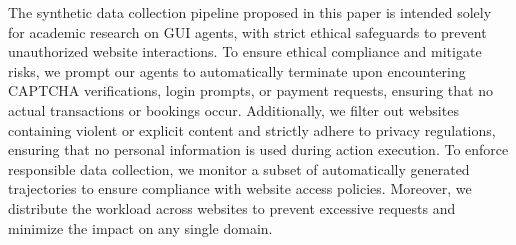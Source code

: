 The synthetic data collection pipeline proposed in this paper is intended solely for academic research on GUI agents, with strict ethical safeguards to prevent unauthorized website interactions.
To ensure ethical compliance and mitigate risks, we prompt our agents to automatically terminate upon encountering CAPTCHA verifications, login prompts, or payment requests, ensuring that no actual transactions or bookings occur.
Additionally, we filter out websites containing violent or explicit content and strictly adhere to privacy regulations, ensuring that no personal information is used during action execution.
To enforce responsible data collection, we monitor a subset of automatically generated trajectories to ensure compliance with website access policies.
Moreover, we distribute the workload across websites to prevent excessive requests and minimize the impact on any single domain.